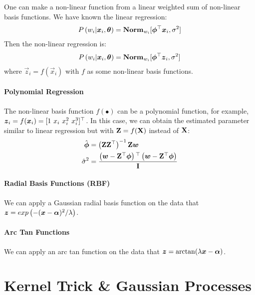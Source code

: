 One can make a non-linear function from a linear weighted sum of non-linear basis functions. We have known the linear regression:
\begin{align*}
	P\left(w_i|\boldsymbol{x}_i,\boldsymbol{\theta}\right)=\mathbf{Norm}_{w_i}[\boldsymbol{\phi}{}^\top\boldsymbol{x}_i,\sigma^2]
\end{align*}
Then the non-linear regression is:
\begin{align*}
	P\left(w_i|\boldsymbol{x}_i,\boldsymbol{\theta}\right)=\mathbf{Norm}_{w_i}[\boldsymbol{\phi}{}^\top\boldsymbol{z}_i,\sigma^2]
\end{align*}
where $\vec{z}_i=f(\vec{x}_i)$ with $f$ as some non-linear basis functions.

\paragraph{Polynomial Regression}

The non-linear basis function $f(\bullet)$ can be a polynomial function, for example, $\vec{z}_i=f(\vec{x}_i)=[1\ x_i\ x_i^2\ x_i^3]\T$. In this case, we can obtain the estimated parameter similar to linear regression but with $\mathbf{Z}=f(\mathbf{X})$ instead of $\mathbf{X}$:
\begin{align*}
	\hat{\boldsymbol{\phi}}&=\left(\mathbf{Z}\mathbf{Z}{}^\top\right)^{-1}\mathbf{Z}\boldsymbol{w} \\
	\hat{\sigma}^2&=\frac{\left(\boldsymbol{w}-\mathbf{Z}{}^\top\boldsymbol{\phi}\right){}^\top\left(\boldsymbol{w}-\mathbf{Z}{}^\top\boldsymbol{\phi}\right)}{\mathbf{I}}
\end{align*}

\paragraph{Radial Basis Functions (RBF)} We can apply a Gaussian radial basis function on the data that $\boldsymbol{z}=exp\left(-(\boldsymbol{x}-\boldsymbol{\alpha})^2/\lambda\right)$.

\paragraph{Arc Tan Functions} We can apply an arc tan function on the data that $\boldsymbol{z}=\arctan(\lambda\boldsymbol{x}-\boldsymbol{\alpha})$.



\section{Kernel Trick \& Gaussian Processes}
\label{section6.5}

